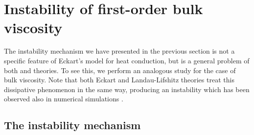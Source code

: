 \documentclass[a4paper, amsfonts, amssymb, amsmath, reprint, showkeys, nofootinbib, twoside]{revtex4-1}
\begin{document}
%

\section{Instability of first-order bulk viscosity}

The instability mechanism we have presented in the previous section is not a specific feature of Eckart's model for heat conduction, but is a general problem of both \cite{Eckart1940} and \cite{landau6} theories. To see this, we perform an analogous study for the case of bulk viscosity. Note that both Eckart and Landau-Lifshitz theories treat this dissipative phenomenon in the same way, producing an instability which has been observed also in numerical simulations \cite{Etele2009}.

\subsection{The instability mechanism}
\end{document}
